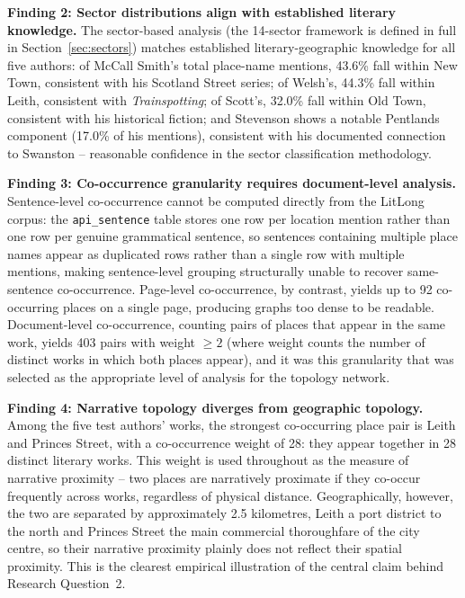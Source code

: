 \documentclass[logo,msc]{infthesis}
\begin{document}
\textbf{Finding 2: Sector distributions align with established literary knowledge.} The sector-based analysis (the 14-sector framework is defined in full in Section~\ref{sec:sectors}) matches established literary-geographic knowledge for all five authors: of McCall Smith's total place-name mentions, 43.6\% fall within New Town, consistent with his Scotland Street series; of Welsh's, 44.3\% fall within Leith, consistent with \textit{Trainspotting}; of Scott's, 32.0\% fall within Old Town, consistent with his historical fiction; and Stevenson shows a notable Pentlands component (17.0\% of his mentions), consistent with his documented connection to Swanston -- reasonable confidence in the sector classification methodology.

\textbf{Finding 3: Co-occurrence granularity requires document-level analysis.} Sentence-level co-occurrence cannot be computed directly from the LitLong corpus: the \texttt{api\_sentence} table stores one row per location mention rather than one row per genuine grammatical sentence, so sentences containing multiple place names appear as duplicated rows rather than a single row with multiple mentions, making sentence-level grouping structurally unable to recover same-sentence co-occurrence. Page-level co-occurrence, by contrast, yields up to 92 co-occurring places on a single page, producing graphs too dense to be readable. Document-level co-occurrence, counting pairs of places that appear in the same work, yields 403 pairs with weight $\geq 2$ (where weight counts the number of distinct works in which both places appear), and it was this granularity that was selected as the appropriate level of analysis for the topology network.

\textbf{Finding 4: Narrative topology diverges from geographic topology.} Among the five test authors' works, the strongest co-occurring place pair is Leith and Princes Street, with a co-occurrence weight of 28: they appear together in 28 distinct literary works. This weight is used throughout as the measure of narrative proximity -- two places are narratively proximate if they co-occur frequently across works, regardless of physical distance. Geographically, however, the two are separated by approximately 2.5 kilometres, Leith a port district to the north and Princes Street the main commercial thoroughfare of the city centre, so their narrative proximity plainly does not reflect their spatial proximity. This is the clearest empirical illustration of the central claim behind Research Question~2.
 
\end{document}
